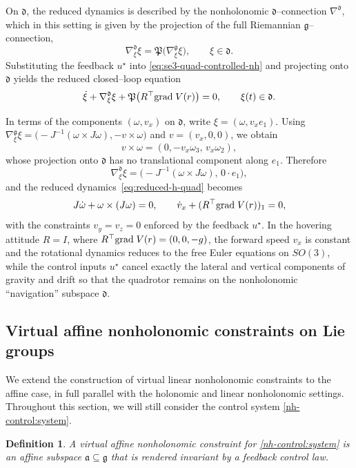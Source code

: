 \documentclass[letterpaper, 10 pt, conference]{ieeeconf}
\newtheorem{definition}{Definition}
\newcommand{\g}{\mathfrak{g}}
\newcommand{\grad}{\normalfont{\text{grad}}}
\begin{document}
On $\mathfrak d$, the reduced dynamics is described by the nonholonomic
$\mathfrak d$--connection $\nabla^{\mathfrak d}$, which in this setting is
given by the projection of the full Riemannian $\mathfrak g$--connection,
\[
\nabla^{\mathfrak d}_{\xi}\xi
= \mathfrak P\big(\nabla^{\mathfrak g}_\xi\xi\big),
\qquad \xi\in\mathfrak d.
\]
Substituting the feedback $u^\star$ into
\eqref{eq:se3-quad-controlled-nh} and projecting onto $\mathfrak d$ yields
the reduced closed--loop equation
\begin{equation}\label{eq:reduced-h-quad}
\dot\xi + \nabla^{\mathfrak d}_{\xi}\xi
+ \mathfrak P\big( R^{\top}\grad \; V(r) \big) = 0,
\qquad \xi(t)\in\mathfrak d.
\end{equation}

In terms of the components $(\omega,v_x)$ on $\mathfrak d$, write
$\xi=(\omega,v_x e_1)$.
Using $\nabla^{\mathfrak g}_\xi\xi
=\big(-J^{-1}(\omega\times J\omega), -v\times\omega\big)$ and
$v=(v_x,0,0)$, we obtain
\[
v\times\omega = (0,-v_x\omega_3,\,v_x\omega_2),
\]
whose projection onto $\mathfrak d$ has no translational component along
$e_1$.  Therefore
\[
\nabla^{\mathfrak d}_\xi\xi
=\big(-J^{-1}(\omega\times J\omega),\,0\cdot e_1\big),
\]
and the reduced dynamics~\eqref{eq:reduced-h-quad} becomes
\[
J\dot\omega + \omega\times(J\omega)=0,
\qquad
\dot v_x + (R^{\top}\grad \; V(r))_1 = 0,
\]
with the constraints $v_y=v_z=0$ enforced by the feedback $u^\star$.
In the hovering attitude $R=I$, where $R^{\top}\grad \; V(r)=(0,0,-g)$, the forward
speed $v_x$ is constant and the rotational dynamics reduces to the free
Euler equations on $SO(3)$, while the control inputs $u^\star$ cancel
exactly the lateral and vertical components of gravity and drift so that
the quadrotor remains on the nonholonomic ``navigation'' subspace
$\mathfrak d$.



\subsection{Virtual affine nonholonomic constraints on Lie groups}

We extend the construction of virtual linear nonholonomic constraints to the
affine case, in full parallel with the holonomic and linear nonholonomic
settings.  Throughout this section, we will still consider the control system \eqref{nh-control:system}.

\begin{definition}
A \emph{virtual affine nonholonomic constraint} for
\eqref{nh-control:system} is an affine subspace
$\mathfrak a\subseteq\g$ that is rendered invariant by a feedback control law.
\end{definition}
\end{document}
